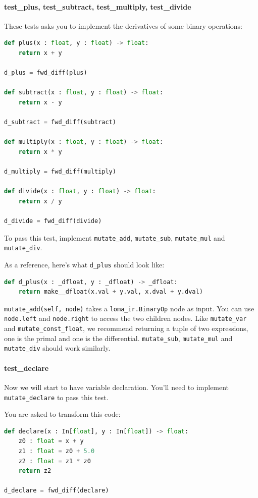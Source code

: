 \paragraph{test_plus, test_subtract, test_multiply, test_divide} These tests asks you to implement the derivatives of some binary operations:
\begin{lstlisting}[language=Python]
def plus(x : float, y : float) -> float:
    return x + y

d_plus = fwd_diff(plus)

def subtract(x : float, y : float) -> float:
    return x - y

d_subtract = fwd_diff(subtract)

def multiply(x : float, y : float) -> float:
    return x * y

d_multiply = fwd_diff(multiply)

def divide(x : float, y : float) -> float:
    return x / y

d_divide = fwd_diff(divide)
\end{lstlisting}
To pass this test, implement \lstinline{mutate_add}, \lstinline{mutate_sub}, \lstinline{mutate_mul} and \lstinline{mutate_div}.

As a reference, here's what \lstinline{d_plus} should look like:
\begin{lstlisting}[language=Python]
def d_plus(x : _dfloat, y : _dfloat) -> _dfloat:
    return make__dfloat(x.val + y.val, x.dval + y.dval)
\end{lstlisting}

\lstinline{mutate_add(self, node)} takes a \lstinline{loma_ir.BinaryOp} node as input. You can use \lstinline{node.left} and \lstinline{node.right} to access the two children nodes. Like \lstinline{mutate_var} and \lstinline{mutate_const_float}, we recommend returning a tuple of two expressions, one is the primal and one is the differential. \lstinline{mutate_sub}, \lstinline{mutate_mul} and \lstinline{mutate_div} should work similarly.

\paragraph{test_declare} Now we will start to have variable declaration. You'll need to implement \lstinline{mutate_declare} to pass this test.

You are asked to transform this code:
\begin{lstlisting}[language=Python]
def declare(x : In[float], y : In[float]) -> float:
    z0 : float = x + y
    z1 : float = z0 + 5.0
    z2 : float = z1 * z0
    return z2

d_declare = fwd_diff(declare)
\end{lstlisting}


